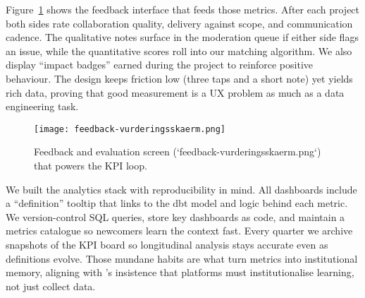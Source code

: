 Figure~\ref{fig:feedback-screen} shows the feedback interface that feeds those metrics. After each project both sides rate collaboration quality, delivery against scope, and communication cadence. The qualitative notes surface in the moderation queue if either side flags an issue, while the quantitative scores roll into our matching algorithm. We also display ``impact badges'' earned during the project to reinforce positive behaviour. The design keeps friction low (three taps and a short note) yet yields rich data, proving that good measurement is a UX problem as much as a data engineering task.

\begin{figure}[h]
  \centering
  \texttt{[image: feedback-vurderingsskaerm.png]}
  \caption{Feedback and evaluation screen (`feedback-vurderingsskaerm.png`) that powers the KPI loop.}
  \label{fig:feedback-screen}
\end{figure}

We built the analytics stack with reproducibility in mind. All dashboards include a ``definition'' tooltip that links to the dbt model and logic behind each metric. We version-control SQL queries, store key dashboards as code, and maintain a metrics catalogue so newcomers learn the context fast. Every quarter we archive snapshots of the KPI board so longitudinal analysis stays accurate even as definitions evolve. Those mundane habits are what turn metrics into institutional memory, aligning with \citet{Choudary2016}'s insistence that platforms must institutionalise learning, not just collect data.
